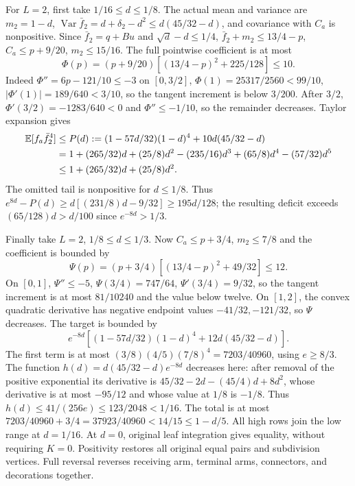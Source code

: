 For $L=2$, first take $1/16\le d\le1/8$.
The actual mean and variance are $m_2=1-d$,
$\operatorname{Var}\bar f_2=d+\delta_2-d^2\le d(45/32-d)$,
and covariance with $C_a$ is nonpositive.
Since $\bar f_2=q+Bu$ and $\sqrt d-d\le1/4$,
$\bar f_2+m_2\le13/4-p$, $C_a\le p+9/20$, $m_2\le15/16$.
The full pointwise coefficient is at most
\[
\Phi(p)=(p+9/20)[(13/4-p)^2+225/128]\le10.
\]
Indeed $\Phi''=6p-121/10\le-3$ on $[0,3/2]$,
$\Phi(1)=25317/2560<99/10$, $|\Phi'(1)|=189/640<3/10$,
so the tangent increment is below $3/200$.
After $3/2$, $\Phi'(3/2)=-1283/640<0$ and
$\Phi''\le-1/10$, so the remainder decreases.
Taylor expansion gives
\begin{align*}
\mathbb E[f_a\bar f_2^4]&\le P(d):=(1-57d/32)(1-d)^4+10d(45/32-d)\\
&=1+(265/32)d+(25/8)d^2-(235/16)d^3
+(65/8)d^4-(57/32)d^5\\
&\le1+(265/32)d+(25/8)d^2.
\end{align*}
The omitted tail is nonpositive for $d\le1/8$.
Thus $e^{8d}-P(d)\ge d[(231/8)d-9/32]\ge195d/128$;
the resulting deficit exceeds $(65/128)d>d/100$ since $e^{-8d}>1/3$.

Finally take $L=2$, $1/8\le d\le1/3$.
Now $C_a\le p+3/4$, $m_2\le7/8$ and the coefficient is bounded by
\[
\Psi(p)=(p+3/4)[(13/4-p)^2+49/32]\le12.
\]
On $[0,1]$, $\Psi''\le-5$,
$\Psi(3/4)=747/64$, $\Psi'(3/4)=9/32$, so the tangent increment
is at most $81/10240$ and the value below twelve.
On $[1,2]$, the convex quadratic derivative has negative endpoint
values $-41/32,-121/32$, so $\Psi$ decreases.
The target is bounded by
\[
e^{-8d}[(1-57d/32)(1-d)^4+12d(45/32-d)].
\]
The first term is at most $(3/8)(4/5)(7/8)^4=7203/40960$,
using $e\ge8/3$. The function
$h(d)=d(45/32-d)e^{-8d}$ decreases here: after removal of the
positive exponential its derivative is
$45/32-2d-(45/4)d+8d^2$, whose derivative is at most $-95/12$
and whose value at $1/8$ is $-1/8$.
Thus $h(d)\le41/(256e)\le123/2048<1/16$.
The total is at most $7203/40960+3/4=37923/40960<14/15\le1-d/5$.
All high rows join the low range at $d=1/16$.
At $d=0$, original leaf integration gives equality, without requiring
$K=0$. Positivity restores all original equal pairs and subdivision
vertices. Full reversal reverses receiving arm, terminal arms,
connectors, and decorations together.
